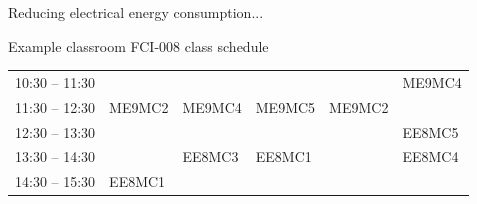 \documentclass[notes=show, 10pt, xcolor=table]{beamer}
\begin{document}
\begin{frame}{Reducing electrical energy consumption...}
\begin{block}{Example classroom FCI-008 class schedule}
\begin{table}[]
\begin{tabular}{@{}|l|l|l|l|l|l|@{}}
            		\rowcolor[HTML]{9AFF99} 
            		10:30 – 11:30                                                                                                                                  & \cellcolor[HTML]{9AFF99}                                              & \cellcolor[HTML]{9AFF99}                                              & \cellcolor[HTML]{9AFF99}                         & \cellcolor[HTML]{9AFF99}                         & \multirow{-2}{*}{\cellcolor[HTML]{9AFF99}ME9MC4} \\ \cmidrule(r){1-1} \cmidrule(l){6-6} 
            		\rowcolor[HTML]{9AFF99} 
            		11:30 – 12:30                                                                                                                                  & \multirow{-2}{*}{\cellcolor[HTML]{9AFF99}ME9MC2}                      & \multirow{-2}{*}{\cellcolor[HTML]{9AFF99}ME9MC4}                      & \multirow{-3}{*}{\cellcolor[HTML]{9AFF99}ME9MC5} & \multirow{-2}{*}{\cellcolor[HTML]{9AFF99}ME9MC2} & \cellcolor[HTML]{FFFFFF}                         \\ \midrule
            		\rowcolor[HTML]{FFFC9E} 
            		12:30 – 13:30                                                                                                                                  & \cellcolor[HTML]{FFFFFF}                                              & \cellcolor[HTML]{FFFC9E}                                              & \cellcolor[HTML]{FFFC9E}                         & \cellcolor[HTML]{FFFFFF}                         & EE8MC5                                           \\ \cmidrule(r){1-2} \cmidrule(l){5-6} 
            		\rowcolor[HTML]{FFFC9E} 
            		13:30 – 14:30                                                                                                                                  & \cellcolor[HTML]{FFFC9E}                                              & \multirow{-2}{*}{\cellcolor[HTML]{FFFC9E}EE8MC3}                      & \multirow{-2}{*}{\cellcolor[HTML]{FFFC9E}EE8MC1} & \cellcolor[HTML]{FFFC9E}                         & EE8MC4                                           \\ \cmidrule(r){1-1} \cmidrule(lr){3-4} \cmidrule(l){6-6} 
            		\rowcolor[HTML]{FFFC9E} 
            		14:30 – 15:30                                                                                                                                  & \multirow{-2}{*}{\cellcolor[HTML]{FFFC9E}EE8MC1}                      & \cellcolor[HTML]{FFFC9E}                                              & \cellcolor[HTML]{FFFC9E}                         & \cellcolor[HTML]{FFFC9E}                         & \cellcolor[HTML]{FFFC9E}                         \\ \cmidrule(r){1-2}

\end{tabular}
\end{table}
\end{block}
\end{frame}
\end{document}
